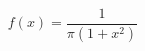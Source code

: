 \documentclass[preview]{standalone}
\begin{document}
\begin{align*}
f(x)=\dfrac{1}{\pi(1+x^2)}
\end{align*}
\end{document}
